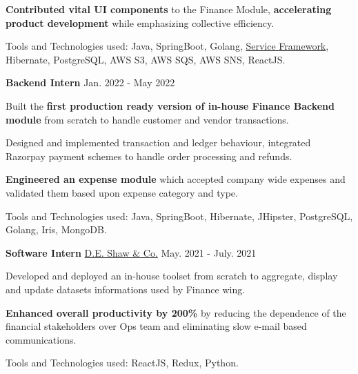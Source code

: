 \begin{cventries}
{\begin{cvitems}
    \item {\textbf{Contributed vital UI components} to the Finance Module, \textbf{accelerating product development} while emphasizing collective efficiency.}
    \item {Tools and Technologies used: Java, SpringBoot, Golang, \href{https://github.com/ironman19933/service-framework}{Service Framework}, Hibernate, PostgreSQL, AWS S3, AWS SQS, AWS SNS, ReactJS.}
\end{cvitems}}
\vspace{1mm}
\cventry
{\textbf{Backend Intern}} %
{} %
{Jan. 2022 - May 2022} %
{} %
{\begin{cvitems} %
    \item {Built the \textbf{first production ready version of in-house Finance Backend module} from scratch to handle customer and vendor transactions.}
    \item {Designed and implemented transaction and ledger behaviour, integrated Razorpay payment schemes to handle order processing and refunds.}
    \item {\textbf{Engineered an expense module} which accepted company wide expenses and validated them based upon expense category and type.}
    \item {Tools and Technologies used: Java, SpringBoot, Hibernate, JHipster, PostgreSQL, Golang, Iris, MongoDB.}
\end{cvitems}}
\vspace{3mm}
\cventry
{\textbf{Software Intern}} %
{\href{https://www.deshaw.com/}{D.E. Shaw \& Co.}}
{May. 2021 - July. 2021} %
{} %
{\begin{cvitems} %
    \item {Developed and deployed an in-house toolset from scratch to aggregate, display and update datasets informations used by Finance wing.}
    \item {\textbf{Enhanced overall productivity by 200\%} by reducing the dependence of the financial stakeholders over Ops team and eliminating slow e-mail based communications.}
    \item {Tools and Technologies used: ReactJS, Redux, Python.}
\end{cvitems}}
\end{cventries}